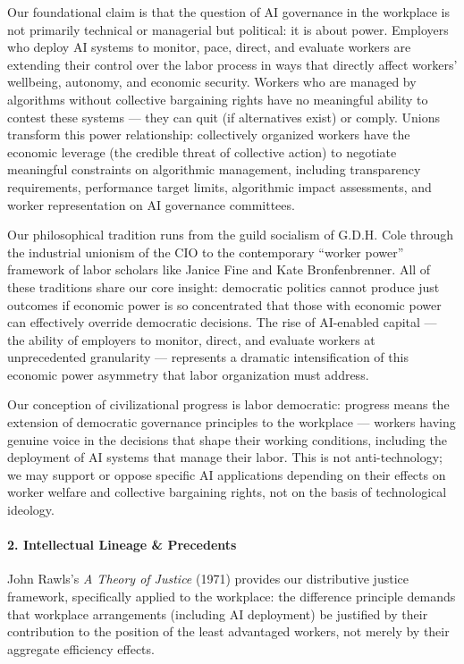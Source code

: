 Our foundational claim is that the question of AI governance in the
workplace is not primarily technical or managerial but political: it is
about power. Employers who deploy AI systems to monitor, pace, direct,
and evaluate workers are extending their control over the labor process
in ways that directly affect workers' wellbeing, autonomy, and economic
security. Workers who are managed by algorithms without collective
bargaining rights have no meaningful ability to contest these systems
--- they can quit (if alternatives exist) or comply. Unions transform
this power relationship: collectively organized workers have the
economic leverage (the credible threat of collective action) to
negotiate meaningful constraints on algorithmic management, including
transparency requirements, performance target limits, algorithmic impact
assessments, and worker representation on AI governance committees.

Our philosophical tradition runs from the guild socialism of G.D.H. Cole
through the industrial unionism of the CIO to the contemporary ``worker
power'' framework of labor scholars like Janice Fine and Kate
Bronfenbrenner. All of these traditions share our core insight:
democratic politics cannot produce just outcomes if economic power is so
concentrated that those with economic power can effectively override
democratic decisions. The rise of AI-enabled capital --- the ability of
employers to monitor, direct, and evaluate workers at unprecedented
granularity --- represents a dramatic intensification of this economic
power asymmetry that labor organization must address.

Our conception of civilizational progress is labor democratic: progress
means the extension of democratic governance principles to the workplace
--- workers having genuine voice in the decisions that shape their
working conditions, including the deployment of AI systems that manage
their labor. This is not anti-technology; we may support or oppose
specific AI applications depending on their effects on worker welfare
and collective bargaining rights, not on the basis of technological
ideology.

\paragraph{2. Intellectual Lineage \&
Precedents}\label{intellectual-lineage-precedents-39}

John Rawls's \emph{A Theory of Justice} (1971) provides our distributive
justice framework, specifically applied to the workplace: the difference
principle demands that workplace arrangements (including AI deployment)
be justified by their contribution to the position of the least
advantaged workers, not merely by their aggregate efficiency effects.

